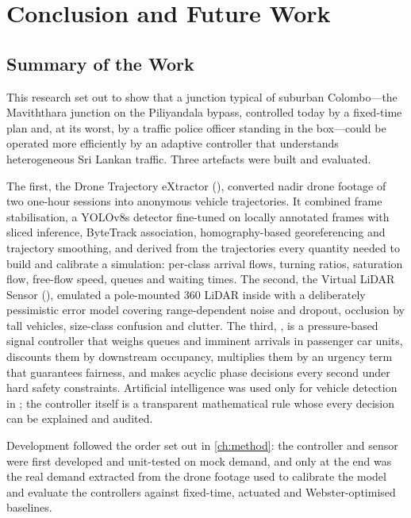 \chapter{Conclusion and Future Work}\label{ch:conclusion}

\section{Summary of the Work}

This research set out to show that a junction typical of suburban Colombo---the Maviththara junction on the Piliyandala bypass, controlled today by a fixed-time plan and, at its worst, by a traffic police officer standing in the box---could be operated more efficiently by an adaptive controller that understands heterogeneous Sri Lankan traffic. Three artefacts were built and evaluated.

The first, the Drone Trajectory eXtractor (\dtx{}), converted nadir drone footage of two one-hour sessions into anonymous vehicle trajectories. It combined frame stabilisation, a YOLOv8s detector fine-tuned on locally annotated frames with sliced inference, ByteTrack association, homography-based georeferencing and trajectory smoothing, and derived from the trajectories every quantity needed to build and calibrate a simulation: per-class arrival flows, turning ratios, saturation flow, free-flow speed, queues and waiting times. The second, the Virtual LiDAR Sensor (\vls{}), emulated a pole-mounted 360\textdegree{} LiDAR inside \sumo{} with a deliberately pessimistic error model covering range-dependent noise and dropout, occlusion by tall vehicles, size-class confusion and clutter. The third, \prism{}, is a pressure-based signal controller that weighs queues and imminent arrivals in passenger car units, discounts them by downstream occupancy, multiplies them by an urgency term that guarantees fairness, and makes acyclic phase decisions every second under hard safety constraints. Artificial intelligence was used only for vehicle detection in \dtx{}; the controller itself is a transparent mathematical rule whose every decision can be explained and audited.

Development followed the order set out in \cref{ch:method}: the controller and sensor were first developed and unit-tested on mock demand, and only at the end was the real demand extracted from the drone footage used to calibrate the model and evaluate the controllers against fixed-time, actuated and Webster-optimised baselines.

